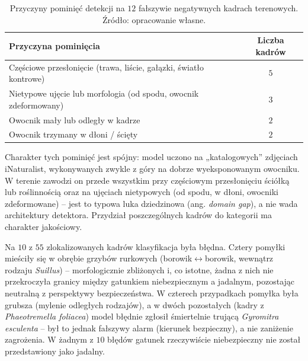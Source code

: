 \begin{table}[htbp]
 \centering
 \small
 \caption{Przyczyny pominięć detekcji na $12$ fałszywie negatywnych kadrach terenowych. Źródło: opracowanie własne.}
 \label{tab:field_fn}
 \begin{tabular}{|p{7.5cm}|c|}
 \hline
 \textbf{Przyczyna pominięcia} & \textbf{Liczba kadrów} \\
 \hline \hline
 Częściowe przesłonięcie (trawa, liście, gałązki, światło kontrowe) & $5$ \\
 \hline
 Nietypowe ujęcie lub morfologia (od spodu, owocnik zdeformowany) & $3$ \\
 \hline
 Owocnik mały lub odległy w kadrze & $2$ \\
 \hline
 Owocnik trzymany w dłoni / ścięty & $2$ \\
 \hline
 \end{tabular}
\end{table}

Charakter tych pominięć jest spójny: model uczono na „katalogowych” zdjęciach iNaturalist, wykonywanych zwykle z góry na dobrze wyeksponowanym owocniku. W terenie zawodzi on przede wszystkim przy częściowym przesłonięciu ściółką lub roślinnością oraz na ujęciach nietypowych (od spodu, w dłoni, owocniki zdeformowane) -- jest to typowa luka dziedzinowa (ang. \textit{domain gap}), a nie wada architektury detektora. Przydział poszczególnych kadrów do kategorii ma charakter jakościowy.

Na $10$ z $55$ zlokalizowanych kadrów klasyfikacja była błędna. Cztery pomyłki mieściły się w obrębie grzybów rurkowych (borowik$\leftrightarrow$borowik, wewnątrz rodzaju \textit{Suillus}) -- morfologicznie zbliżonych i, co istotne, żadna z nich nie przekroczyła granicy między gatunkiem niebezpiecznym a jadalnym, pozostając neutralną z perspektywy bezpieczeństwa. W czterech przypadkach pomyłka była grubsza (mylenie odległych rodzajów), a w dwóch pozostałych (kadry z \textit{Phaeotremella foliacea}) model błędnie zgłosił śmiertelnie trującą \textit{Gyromitra esculenta} -- był to jednak fałszywy alarm (kierunek bezpieczny), a nie zaniżenie zagrożenia. W żadnym z $10$ błędów gatunek rzeczywiście niebezpieczny nie został przedstawiony jako jadalny.

